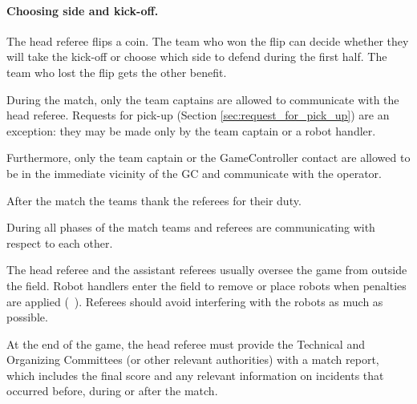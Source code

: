 \paragraph{Choosing side and kick-off.} The head referee flips a coin. The team who won the flip can decide whether they will take the kick-off or choose which side to defend during the first half. The team who lost the flip gets the other benefit.

\label{sec:referee_team_communication}

During the match, only the team captains are allowed to communicate with the head referee. Requests for pick-up (Section \ref{sec:request_for_pick_up}) are an exception: they may be made only by the team captain or a robot handler.

Furthermore, only the team captain or the GameController contact are allowed to be in the immediate vicinity of the GC and communicate with the operator.

After the match the teams thank the referees for their duty.

During all phases of the match teams and referees are communicating with respect to each other.

\label{sec:referee_during_match}

The head referee and the assistant referees usually oversee the game from outside the field. Robot handlers enter the field to remove or place robots when penalties are applied (\cf~). Referees should avoid interfering with the robots as much as possible.


At the end of the game, the head referee must provide the Technical and Organizing Committees (or other relevant authorities) with a match report, which includes the final score and any relevant information on incidents that occurred before, during or after the match.
